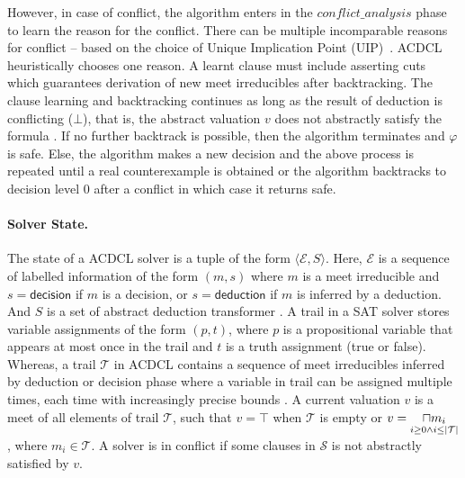 However, in case of \textsf{conflict}, the algorithm enters in the
$\mathit{conflict\_analysis}$ phase to learn the reason for the
conflict.  There can be multiple incomparable reasons for conflict --
based on the choice of Unique Implication Point (UIP)~\cite{cdcl}.
ACDCL heuristically chooses one reason.  A learnt clause must include
asserting cuts which guarantees derivation of new meet irreducibles
after backtracking. The clause learning and backtracking continues as
long as the result of deduction is conflicting ($\bot$), that is, the
abstract valuation $v$ does not abstractly satisfy the formula
.  If no further backtrack is possible, then the
algorithm terminates and $\varphi$ is \textsf{safe}. Else, the
algorithm makes a new decision and the above process is repeated until
a real counterexample  is obtained or the
algorithm backtracks to decision level 0 after a conflict in which
case it returns \textsf{safe}.

\paragraph{Solver State.}   The state of a ACDCL solver is a tuple 
of the form $\langle \mathcal{E}, S \rangle$.  Here, $\mathcal{E}$ 
is a sequence of labelled information of the form $(m,s)$ where 
$m$ is a meet irreducible and $s = \mathsf{decision}$ if $m$ is a decision, 
or $s = \mathsf{deduction}$ if $m$ is inferred by a deduction. And $S$ is 
a set of abstract deduction transformer .  A trail in a SAT solver 
stores variable assignments of the form $(p, t)$, where $p$ is 
a propositional variable that appears at most once in the trail 
and $t$ is a truth assignment (true or false).  Whereas, a trail 
$\mathcal{T}$ in ACDCL contains a sequence of meet irreducibles 
inferred by deduction or decision phase where a variable in trail 
can be assigned  multiple times, each time with increasingly precise 
bounds .  A current valuation $v$ is a meet of all elements of trail
$\mathcal{T}$, such that $v = \top$ when $\mathcal{T}$ is 
empty or $v=\underset{i \geq 0 \wedge i \leq |\mathcal{T}|}{\sqcap m_i}$, where 
$m_i \in \mathcal{T}$.  A solver is in conflict if some clauses in
$\mathcal{S}$ is not abstractly satisfied by $v$.

